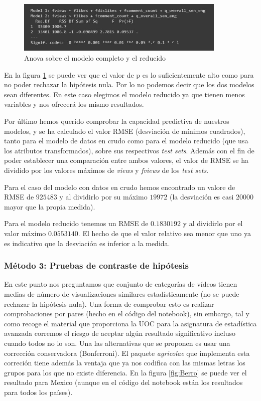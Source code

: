 \documentclass[a4paper,12pt]{article}
\begin{document}
\begin{figure}[h!]
\centering
\includegraphics[width=10cm]{anova_modelos.JPG}
\caption{Anova sobre el modelo completo y el reducido}
\label{fig:anov}
\end{figure}

En la figura \ref{fig:anov} se puede ver que el valor de p es lo suficientemente alto como para no poder rechazar la hip\'otesis nula. Por lo no podemos decir que los dos modelos sean diferentes. En este caso elegimos el modelo reducido ya que tienen menos variables y nos ofrecer\'a los mismo resultados.

Por \'ultimo hemos querido comprobar la capacidad predictiva de nuestros modelos, y se ha calculado el valor RMSE (desviaci\'on de m\'inimos cuadrados), tanto para el modelo de datos en crudo como para el modelo reducido (que usa los atributos transformados), sobre sus respectivos {\itshape test sets}. Adem\'as con el fin de poder establecer una comparaci\'on entre ambos valores, el valor de RMSE se ha dividido por los valores m\'aximos de {\itshape views} y {\itshape fviews} de los {\itshape test sets}.

Para el caso del modelo con datos en crudo hemos encontrado un valore de RMSE de $925483$ y al dividirlo por su m\'aximo $19972$ (la desviaci\'on es casi 20000 mayor que la propia medida). 

Para el modelo reducido tenemos un RMSE de $0.1830192$ y al dividirlo por el valor m\'aximo $0.0553140$. El hecho de que el valor relativo sea menor que uno ya es indicativo que la desviaci\'on es inferior a la medida.  

\subsubsection{M\'etodo 3: Pruebas de contraste de hip\'otesis}

En este punto nos preguntamos que conjunto de categor\'ias de v\'ideos tienen medias de n\'umero de visualizaciones similares estad\'isticamente (no se puede rechazar la hip\'otesis nula). Una forma de comprobar esto es realizar comprobaciones por pares (hecho en el c\'odigo del notebook), sin embargo, tal y como recoge el material que proporciona la UOC para la asignatura de estad\'istica avanzada corremos el riesgo de aceptar alg\'un resultado significativo incluso cuando todos no lo son. Una las alternativas que se proponen es usar una correcci\'on conservadora (Bonferroni). El paquete {\itshape agricolae} que implementa esta correci\'on tiene adem\'as la ventaja que ya nos codifica con las mismas letras los grupos para los que no existe diferencia. En la figura \ref{fig:Berro} se puede ver el resultado para Mexico (aunque en el c\'odigo del notebook est\'an los resultados para todos los pa\'ises).
\end{document}
